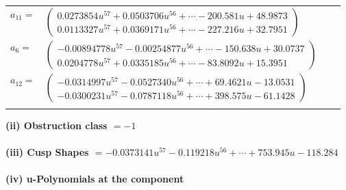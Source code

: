 \documentclass[1p]{elsarticle_modified}
\theoremstyle{definition}
\begin{document}
\begin{tabular}{m{7pt} m{180pt} m{7pt} m{180pt} }
\flushright $a_{11}=$&$\begin{pmatrix}0.0273854 u^{57}+0.0503706 u^{56}+\cdots-200.581 u+48.9873\\0.0113327 u^{57}+0.0369171 u^{56}+\cdots-227.216 u+32.7951\end{pmatrix}$ \\
\flushright $a_{6}=$&$\begin{pmatrix}-0.00894778 u^{57}-0.00254877 u^{56}+\cdots-150.638 u+30.0737\\0.0204778 u^{57}+0.0335185 u^{56}+\cdots-83.8092 u+15.3951\end{pmatrix}$ \\
\flushright $a_{12}=$&$\begin{pmatrix}-0.0314997 u^{57}-0.0527340 u^{56}+\cdots+69.4621 u-13.0531\\-0.0300231 u^{57}-0.0787118 u^{56}+\cdots+398.575 u-61.1428\end{pmatrix}$\\&\end{tabular}
\flushleft \textbf{(ii) Obstruction class $= -1$}\\~\\
\flushleft \textbf{(iii) Cusp Shapes $= -0.0373141 u^{57}-0.119218 u^{56}+\cdots+753.945 u-118.284$}\\~\\
\newpage\renewcommand{\arraystretch}{1}
\flushleft \textbf{(iv) u-Polynomials at the component}\newline \\
\end{document}
